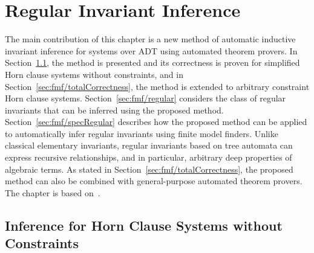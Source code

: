\chapter{Regular Invariant Inference}\label{ch:fmf}

The main contribution of this chapter is a new method of automatic inductive invariant inference for systems over ADT using automated theorem provers.
In Section~\cref{sec:fmf/partialCorrectness}, the method is presented and its correctness is proven for simplified Horn clause systems without constraints, and in Section~\cref{sec:fmf/totalCorrectness}, the method is extended to arbitrary constraint Horn clause systems.
Section~\cref{sec:fmf/regular} considers the class of regular invariants that can be inferred using the proposed method.
Section~\cref{sec:fmf/specRegular} describes how the proposed method can be applied to automatically infer regular invariants using finite model finders.
Unlike classical elementary invariants, regular invariants based on tree automata can express recursive relationships, and in particular, arbitrary deep properties of algebraic terms.
As stated in Section~\cref{sec:fmf/totalCorrectness}, the proposed method can also be combined with general-purpose automated theorem provers.
The chapter is based on~\cite{10.1145/3453483.3454055}.

\section{Inference for Horn Clause Systems without Constraints}\label{sec:fmf/partialCorrectness}

